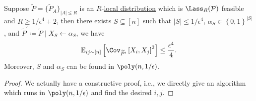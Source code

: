 \begin{theorem}\label{thm:lec16}
	Suppose \(\widetilde{P} =\{ \widetilde{P} _A \}_{\left\vert A \right\vert \leq R} \) is an \(R\)-\hyperref[def:local-distribution]{local distribution} which is \(\Lass_R(\mathcal{P})\) feasible and \(R \geq 1 / \epsilon ^4 + 2\), then there exists \(S \subseteq [n]\) such that \(\left\vert S \right\vert \leq 1 / \epsilon ^4\), \(\alpha _S \in \left\{ 0, 1 \right\} ^{\left\vert S \right\vert }\), and \(\widetilde{P} ^\prime \coloneqq \widetilde{P} \mid X_S\gets \alpha _S\), we have
	\[
		\mathbb{E}_{ij\sim [n]}\left[\Cov_{\widetilde{P} ^\prime }\left[X_i, X_j \right]^{2} \right] \leq \frac{\epsilon ^4}{4}.
	\]
	Moreover, \(S\) and \(\alpha _S\) can be found in \(\poly(n, 1 / \epsilon )\).
\end{theorem}
\begin{proof}
	We actually have a constructive proof, i.e., we directly give an algorithm which runs in \(\poly(n, 1 / \epsilon )\) and find the desired \(i, j\).


\end{proof}
